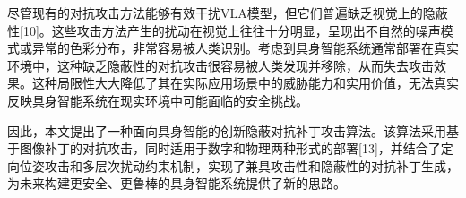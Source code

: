 尽管现有的对抗攻击方法能够有效干扰VLA模型，但它们普遍缺乏视觉上的隐蔽性[10]。这些攻击方法产生的扰动在视觉上往往十分明显，呈现出不自然的噪声模式或异常的色彩分布，非常容易被人类识别。考虑到具身智能系统通常部署在真实环境中，这种缺乏隐蔽性的对抗攻击很容易被人类发现并移除，从而失去攻击效果。这种局限性大大降低了其在实际应用场景中的威胁能力和实用价值，无法真实反映具身智能系统在现实环境中可能面临的安全挑战。

因此，本文提出了一种面向具身智能的创新隐蔽对抗补丁攻击算法。该算法采用基于图像补丁的对抗攻击，同时适用于数字和物理两种形式的部署[13]，并结合了定向位姿攻击和多层次扰动约束机制，实现了兼具攻击性和隐蔽性的对抗补丁生成，为未来构建更安全、更鲁棒的具身智能系统提供了新的思路。


\cite{huangResearchU2019}	%
